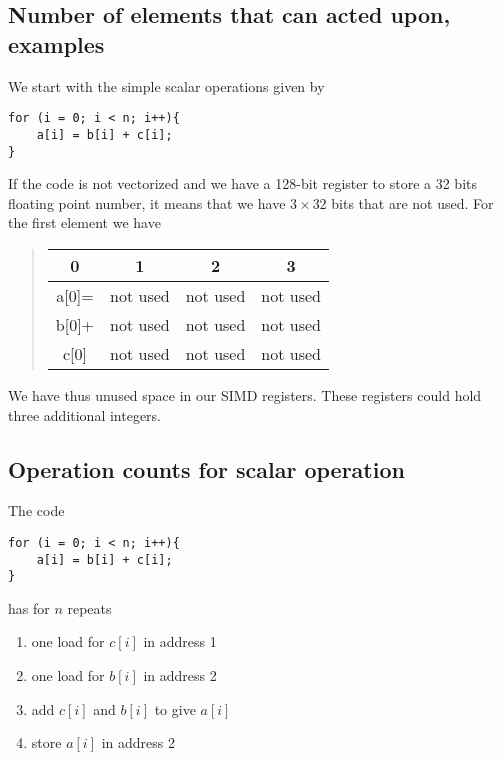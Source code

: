 \documentclass[%
oneside,                 %
final,                   %
10pt]{article}
\begin{document}
\noindent
\subsection*{Number of elements that can acted upon, examples}
We start with the simple scalar operations given by




\begin{verbatim}
for (i = 0; i < n; i++){
    a[i] = b[i] + c[i];
}

\end{verbatim}

If the code is not vectorized  and we have a 128-bit register to store a 32 bits floating point number,
it means that we have $3\times 32$ bits that are not used. For the first element we have


\begin{quote}
\begin{tabular}{cccc}
\hline
\multicolumn{1}{c}{ 0 } & \multicolumn{1}{c}{ 1 } & \multicolumn{1}{c}{ 2 } & \multicolumn{1}{c}{ 3 } \\
\hline
a[0]= & not used & not used & not used \\
\hline
b[0]+ & not used & not used & not used \\
\hline
c[0]  & not used & not used & not used \\
\hline
\end{tabular}
\end{quote}

\noindent
We have thus unused space in our SIMD registers. These registers could hold three additional integers.

\subsection*{Operation counts for scalar operation}
The code




\begin{verbatim}
for (i = 0; i < n; i++){
    a[i] = b[i] + c[i];
}

\end{verbatim}

has for $n$ repeats
\begin{enumerate}
\item one load for $c[i]$ in address 1

\item one load for $b[i]$ in address 2

\item add $c[i]$ and $b[i]$ to give $a[i]$

\item store $a[i]$ in address 2
\end{enumerate}
\end{document}
